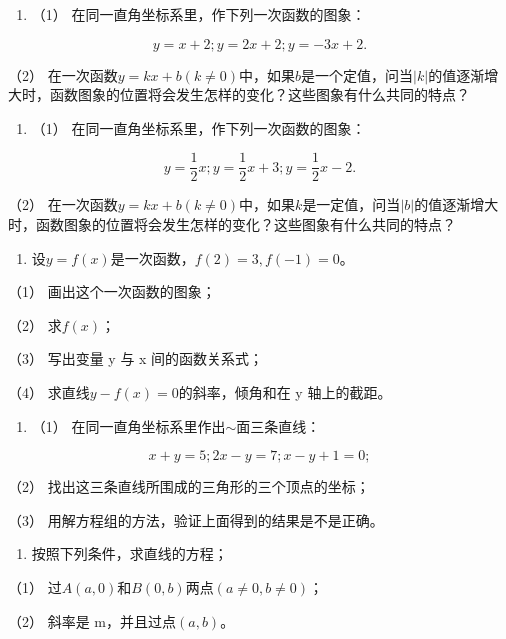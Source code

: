 \begin{enumerate}
\item
  （1） 在同一直角坐标系里，作下列一次函数的图象：
\end{enumerate}

\[
y = x + 2; y = 2 x + 2; y = - 3 x + 2.
\]

（2）
在一次函数\(y = kx + b (k \neq 0)\)中，如果\(b\)是一个定值，问当\(|k|\)的值逐渐增大时，函数图象的位置将会发生怎样的变化？这些图象有什么共同的特点？

\begin{enumerate}[start=2]
\item
  （1） 在同一直角坐标系里，作下列一次函数的图象：
\end{enumerate}

\[
y = \frac{1}{2} x; y = \frac{1}{2} x + 3; y = \frac{1}{2} x - 2.
\]

（2）
在一次函数\(y = kx + b (k \neq 0)\)中，如果\(k\)是一定值，问当\(|b|\)的值逐渐增大时，函数图象的位置将会发生怎样的变化？这些图象有什么共同的特点？

\begin{enumerate}[start=3]
\item
  设\(y = f(x)\)是一次函数，\(f(2) = 3, f(-1) = 0\)。
\end{enumerate}

（1） 画出这个一次函数的图象；

（2） 求\(f(x)\)；

（3） 写出变量 y 与 x 间的函数关系式；

（4） 求直线\(y - f(x) = 0\)的斜率，倾角和在 y 轴上的截距。

\begin{enumerate}[start=4]
\item
  （1） 在同一直角坐标系里作出\(\sim\)面三条直线：
\end{enumerate}

\[
x + y = 5; 2 x - y = 7; x - y + 1 = 0;
\]

（2） 找出这三条直线所围成的三角形的三个顶点的坐标；

（3） 用解方程组的方法，验证上面得到的结果是不是正确。

\begin{enumerate}[start=5]
\item
  按照下列条件，求直线的方程；
\end{enumerate}

（1） 过\(A(a,0)\)和\(B(0,b)\)两点\((a\neq 0,b\neq 0)\)；

（2） 斜率是 m，并且过点\((a, b)\)。

